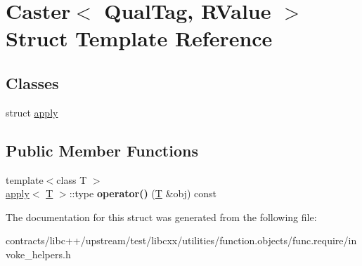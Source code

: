 \hypertarget{struct_caster}{}\section{Caster$<$ Qual\+Tag, R\+Value $>$ Struct Template Reference}
\label{struct_caster}
\subsection*{Classes}
\begin{DoxyCompactItemize}
\item 
struct \mbox{\hyperlink{struct_caster_1_1apply}{apply}}
\end{DoxyCompactItemize}
\subsection*{Public Member Functions}
\begin{DoxyCompactItemize}
\item 
\mbox{\label{struct_caster_a12700ce02062d5e6b7a188d0516daed0}} 
{\footnotesize template$<$class T $>$ }\\\mbox{\hyperlink{struct_caster_1_1apply}{apply}}$<$ \mbox{\hyperlink{struct_t}{T}} $>$\+::type {\bfseries operator()} (\mbox{\hyperlink{struct_t}{T}} \&obj) const
\end{DoxyCompactItemize}


The documentation for this struct was generated from the following file\+:\begin{DoxyCompactItemize}
\item 
contracts/libc++/upstream/test/libcxx/utilities/function.\+objects/func.\+require/invoke\+\_\+helpers.\+h\end{DoxyCompactItemize}
